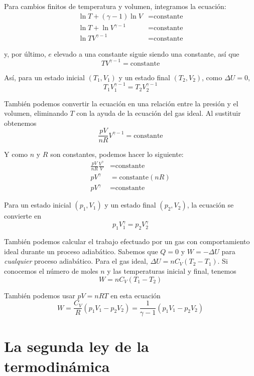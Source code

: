 \documentclass[12pt]{article}
\begin{document}
  Para cambios finitos de temperatura y volumen, integramos la ecuación:
  \begin{align*}
    \ln{T} + (\gamma - 1)\ln{V} &= \text{constante}\\
    \ln{T} + \ln{V^{\gamma - 1}} &= \text{constante}\\
    \ln{TV^{\gamma - 1}} &= \text{constante}
  \end{align*}

  y, por último, $ e $ elevado a una constante siguie siendo una constante, así que
  \[
  TV^{\gamma - 1} = \text{constante}
  \]

  Así, para un estado inicial $ (T_{1}, V_{1}) $ y un estado final $ (T_{2}, V_{2}) $, como $ \Delta U = 0 $,
  \[
  T_{1}V_{1}^{\gamma - 1} = T_{2}V_{2}^{\gamma - 1} 
  \]

  También podemos convertir la ecuación en una relación entre la presión y el volumen, eliminando $ T $ con la ayuda de la ecuación del gas ideal. Al sustituir obtenemos
  \[
  \frac{pV}{nR}V^{\gamma - 1} = \text{constante}
  \]
  
  Y como $ n $ y $ R $ son constantes, podemos hacer lo siguiente:
  \begin{align*}
    \frac{pV}{nR}\frac{V^{\gamma}}{V} &= \text{constante}\\
    pV^{\gamma} &= \text{constante}(nR)\\
    pV^{\gamma} &= \text{constante}
  \end{align*}

  Para un estado inicial $ (p_{1}, V_{1}) $ y un estado final $ (p_{2}, V_{2}) $, la ecuación se convierte en 
  \[
  p_{1}V_{1}^{\gamma} = p_{2}V_{2}^{\gamma}
  \]

  También podemos calcular el trabajo efectuado por un gas con comportamiento ideal durante un proceso adiabático. Sabemos que $ Q = 0 $ y $ W = -\Delta U $ para \textit{cualquier} proceso adiabático. Para el gas ideal, $ \Delta U = nC_{V}(T_{2} - T_{1}) $. Si conocemos el número de moles $ n $ y las temperaturas inicial y final, tenemos 
  \[
    W = nC_{V}(T_{1}-T_{2})
  \]

  También podemos usar $ pV = nRT $ en esta ecuación
  \[
    W = \frac{C_{V}}{R}(p_{1}V_{1} - p_{2}V_{2}) = \frac{1}{\gamma - 1}(p_{1}V_{1} - p_{2}V_{2})
  \]

  \section{La segunda ley de la termodinámica}























  
\end{document}
